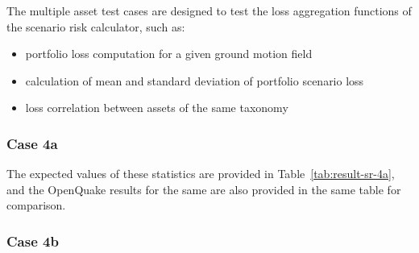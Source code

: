 The multiple asset test cases are designed to test the loss aggregation functions of the scenario risk calculator, such as:

\begin{itemize}
\item portfolio loss computation for a given ground motion field
\item calculation of mean and standard deviation of portfolio scenario loss
\item loss correlation between assets of the same taxonomy
\end{itemize}

\subsubsection{Case 4a}


 The expected values of these statistics are provided in Table~\ref{tab:result-sr-4a}, and the OpenQuake results for the same are also provided in the same table for comparison.

\subsubsection{Case 4b}

% 
% 
% 

% 
% 

